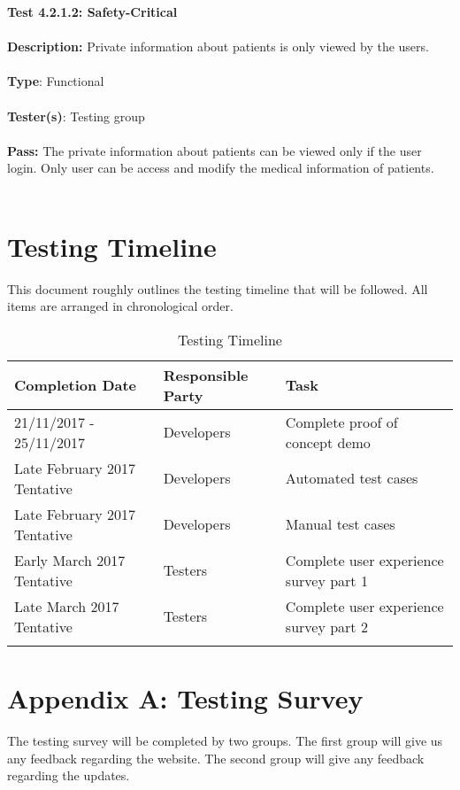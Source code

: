 \documentclass[12pt]{article}
\begin{document}
\begin{tcolorbox}
\textbf{Test 4.2.1.2: Safety-Critical } \\ \\
\textbf{Description:} Private information about patients is only viewed by the users. \\ \\
\textbf{Type}: Functional  \\ \\
\textbf{Tester(s)}: Testing group \\ \\
\textbf{Pass:} The private information about patients can be viewed only if the user login. Only user can be access and modify the medical information of patients. \\ \\
\end{tcolorbox}

\newpage

\section{Testing Timeline}
This document roughly outlines the testing timeline that will be followed. All items are arranged in chronological order.

\begin{longtable}{|p{5cm}|p{5cm}|p{5cm}|}
\hline
\textbf{Completion Date} & \textbf{Responsible Party} & \textbf{Task} \\
\hline
21/11/2017 - 25/11/2017 & Developers  & Complete proof of concept demo \\
\hline
Late February 2017 Tentative & Developers  & Automated test cases \\
\hline
Late February 2017 Tentative & Developers  & Manual test cases \\
\hline
Early March 2017 Tentative & Testers & Complete user experience survey part 1 \\
\hline
Late March 2017 Tentative & Testers & Complete user experience survey part 2 \\
\hline

\caption{Testing Timeline}
\label{tab:testtimeline}
\end{longtable}

\newpage

\section{Appendix A: Testing Survey}
The testing survey will be completed by two groups. The first group will give us any feedback regarding the website. The second group will give any feedback regarding the updates.
\end{document}
